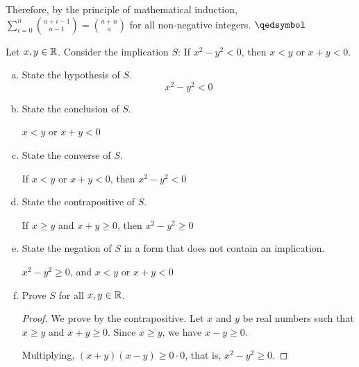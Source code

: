 \documentclass{agony}
\begin{document}
Therefore, by the principle of mathematical induction,
$\sum_{i=0}^n\binom{a+i-1}{a-1} = \binom{a+n}{a}$
for all non-negative integers. $\qedsymbol$


\question Let $x,y\in\mathbb{R}$. Consider the implication $S$:
If $x^2-y^2 < 0$, then $x<y$ or $x+y < 0$.
\begin{enumerate}[(a)]
  \item State the hypothesis of $S$.
        \[ x^2-y^2 < 0 \]
  \item State the conclusion of $S$.
        \begin{center}
          $x<y$ or $x+y<0$
        \end{center}
  \item State the converse of $S$.
        \begin{center}
          If $x<y$ or $x+y<0$, then $x^2-y^2<0$
        \end{center}
  \item State the contrapositive of $S$.
        \begin{center}
          If $x\geq y$ and $x+y \geq 0$, then $x^2-y^2 \geq 0$
        \end{center}
  \item State the negation of $S$ in a form that does not contain an implication.
        \begin{center}
          $x^2-y^2 \geq 0$, and $x<y$ or $x+y<0$
        \end{center}
  \item Prove $S$ for all $x,y\in\mathbb{R}$.
        \begin{proof}
          We prove by the contrapositive.
          Let $x$ and $y$ be real numbers such that $x \geq y$ and $x+y \geq 0$.
          Since $x \geq y$, we have $x-y \geq 0$.

          Multiplying, $(x+y)(x-y) \geq 0\cdot 0$, that is, $x^2-y^2 \geq 0$.
        \end{proof}
\end{enumerate}
\end{document}
